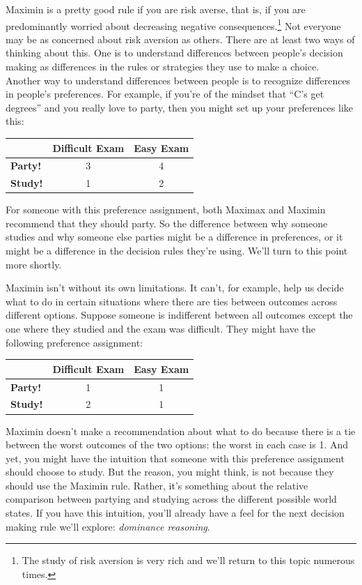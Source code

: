 \documentclass[]{tufte-book}
\begin{document}
Maximin is a pretty good rule if you are risk averse, that is, if you are predominantly worried about decreasing negative consequences.\footnote{The study of risk aversion is very rich and we'll return to this topic numerous times.} Not everyone may be as concerned about risk aversion as others. There are at least two ways of thinking about this. One is to understand differences between people's decision making as differences in the rules or strategies they use to make a choice. Another way to understand differences between people is to recognize differences in people's preferences. For example, if you're of the mindset that ``C's get degrees'' and you really love to party, then you might set up your preferences like this:

\begin{longtable}[]{@{}lcc@{}}
\toprule
& Difficult Exam & Easy Exam\tabularnewline
\midrule
\endhead
\textbf{Party!} & 3 & 4\tabularnewline
\textbf{Study!} & 1 & 2\tabularnewline
\bottomrule
\end{longtable}

For someone with this preference assignment, both Maximax and Maximin recommend that they should party. So the difference between why someone studies and why someone else parties might be a difference in preferences, or it might be a difference in the decision rules they're using. We'll turn to this point more shortly.

Maximin isn't without its own limitations. It can't, for example, help us decide what to do in certain situations where there are ties between outcomes across different options. Suppose someone is indifferent between all outcomes except the one where they studied and the exam was difficult. They might have the following preference assignment:

\begin{longtable}[]{@{}lcc@{}}
\toprule
& Difficult Exam & Easy Exam\tabularnewline
\midrule
\endhead
\textbf{Party!} & 1 & 1\tabularnewline
\textbf{Study!} & 2 & 1\tabularnewline
\bottomrule
\end{longtable}

Maximin doesn't make a recommendation about what to do because there is a tie between the worst outcomes of the two options: the worst in each case is 1. And yet, you might have the intuition that someone with this preference assignment should choose to study. But the reason, you might think, is not because they should use the Maximin rule. Rather, it's something about the relative comparison between partying and studying across the different possible world states. If you have this intuition, you'll already have a feel for the next decision making rule we'll explore: \emph{dominance reasoning}.
\end{document}
